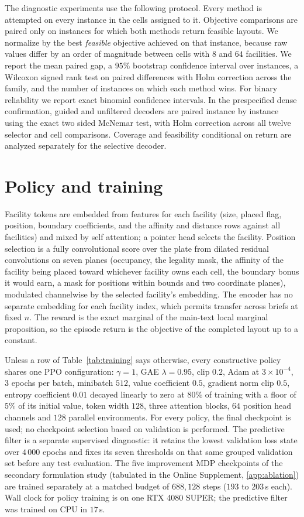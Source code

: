 \documentclass[11pt]{article}
\begin{document}
The diagnostic experiments use the following protocol.
Every method is attempted on every instance in the cells assigned to it.
Objective comparisons are paired only on instances for which both methods return
feasible layouts. We normalize by the best \emph{feasible} objective achieved on
that instance, because raw values differ by an order of magnitude between cells
with $8$ and $64$ facilities. We report the mean paired gap, a $95\%$
bootstrap confidence interval over instances, a Wilcoxon signed rank test on
paired differences with Holm correction across the family, and the number of
instances on which each method wins. For binary reliability we report exact
binomial confidence intervals. In the prespecified dense confirmation, guided and
unfiltered decoders are paired instance by instance using the exact two sided
McNemar test, with Holm correction across all twelve selector and cell comparisons.
Coverage and feasibility conditional on return are analyzed separately for the
selective decoder.

\section{Policy and training}
\label{app:policy}
Facility tokens are embedded from features for each facility (size, placed flag,
position, boundary coefficients, and the affinity and distance rows against all
facilities) and mixed by self attention; a pointer head selects the facility.
Position selection is a fully convolutional score over the plate from dilated
residual convolutions on seven planes (occupancy, the legality mask, the affinity
of the facility being placed toward whichever facility owns each cell, the
boundary bonus it would earn, a mask for positions within bounds and two coordinate planes),
modulated channelwise by the selected facility's embedding. The encoder has no
separate embedding for each facility index, which permits transfer across briefs at
fixed $n$. The reward is the exact marginal of the main-text local marginal proposition,
so the episode return is the objective of the completed layout up to a
constant.

Unless a row of Table~\ref{tab:training} says otherwise, every constructive
policy shares one PPO configuration: $\gamma=1$, GAE $\lambda=0.95$, clip
$0.2$, Adam at $3\times10^{-4}$, $3$ epochs per batch, minibatch $512$,
value coefficient $0.5$, gradient norm clip $0.5$, entropy coefficient $0.01$
decayed linearly to zero at $80\%$ of training with a floor of $5\%$ of its
initial value, token width $128$, three attention blocks, $64$ position head
channels and $128$ parallel environments. For every policy, the final checkpoint
is used; no checkpoint selection based on validation is performed. The predictive
filter is a separate supervised diagnostic: it retains the lowest validation loss
state over $4\,000$ epochs and fixes its seven thresholds on that same grouped
validation set before any test evaluation. The five
improvement MDP checkpoints of the secondary formulation study (tabulated
in the Online Supplement, \ref{app:ablation}) are trained separately
at a matched budget of $688{,}128$ steps ($193$ to $203$\,s each). Wall clock
for policy training is on one RTX 4080 SUPER; the predictive filter was trained
on CPU in $17$\,s.
\end{document}
